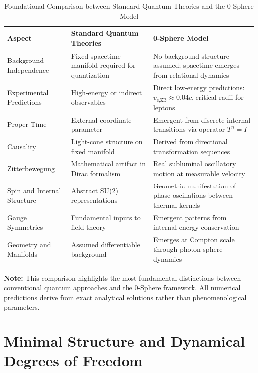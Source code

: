 \documentclass[%
 reprint,
 amsmath,amssymb,
 aps,
]{revtex4-1}
\numberwithin{equation}{section}%
\begin{document}
\begin{table}[!htbp]
\caption{Foundational Comparison between Standard Quantum Theories and the 0-Sphere Model}
\label{tab:comparison_s0}
\renewcommand{\arraystretch}{1.4}
\begin{tabular}{p{4.5cm}p{6.0cm}p{6.0cm}}
\toprule
\textbf{Aspect} & \textbf{Standard Quantum Theories} & \textbf{0-Sphere Model} \\
\midrule
Background Independence & Fixed spacetime manifold required for quantization & No background structure assumed; spacetime emerges from relational dynamics \\
\addlinespace[0.3cm]
Experimental Predictions & High-energy or indirect observables & Direct low-energy predictions: $v_{\text{e,ZB}} \approx 0.04c$, critical radii for leptons~\cite{hanamura2501.0130} \\
\addlinespace[0.3cm]
Proper Time & External coordinate parameter & Emergent from discrete internal transitions via operator $T^n = I$ \\
\addlinespace[0.3cm]
Causality & Light-cone structure on fixed manifold & Derived from directional transformation sequences \\
\addlinespace[0.3cm]
Zitterbewegung & Mathematical artifact in Dirac formalism & Real subluminal oscillatory motion at measurable velocity \\
\addlinespace[0.3cm]
Spin and Internal Structure & Abstract SU(2) representations & Geometric manifestation of phase oscillations between thermal kernels \\
\addlinespace[0.3cm]
Gauge Symmetries & Fundamental inputs to field theory & Emergent patterns from internal energy conservation \\
\addlinespace[0.3cm]
Geometry and Manifolds & Assumed differentiable background & Emerges at Compton scale through photon sphere dynamics \\
\bottomrule
\end{tabular}
\vspace{0.2cm}
\begin{flushleft}
\footnotesize
\textbf{Note:} This comparison highlights the most fundamental distinctions between conventional quantum approaches and the 0-Sphere framework. All numerical predictions derive from exact analytical solutions rather than phenomenological parameters.
\end{flushleft}
\end{table}


\section{Minimal Structure and Dynamical Degrees of Freedom}
\label{sec:minimal_structure}
\end{document}
